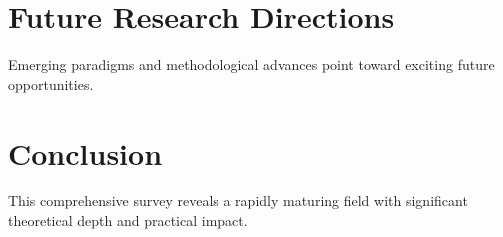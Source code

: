\documentclass[11pt,twocolumn]{article}
\begin{document}
\section{Future Research Directions}
Emerging paradigms and methodological advances point toward exciting future opportunities.

\section{Conclusion}
This comprehensive survey reveals a rapidly maturing field with significant theoretical depth and practical impact.



\end{document}

